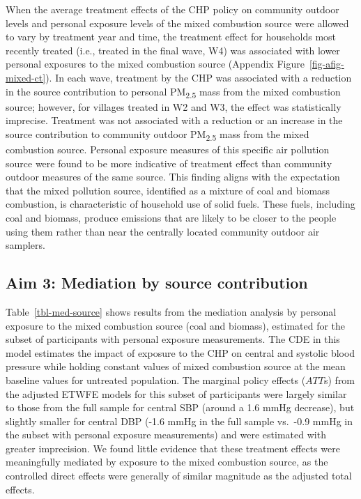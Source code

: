 \documentclass[
  letterpaper,
  DIV=11,
  numbers=noendperiod]{scrartcl}
\begin{document}
When the average treatment effects of the CHP policy on community
outdoor levels and personal exposure levels of the mixed combustion
source were allowed to vary by treatment year and time, the treatment
effect for households most recently treated (i.e., treated in the final
wave, W4) was associated with lower personal exposures to the mixed
combustion source (Appendix Figure~\ref{fig-afig-mixed-ct}). In each
wave, treatment by the CHP was associated with a reduction in the source
contribution to personal PM\textsubscript{2.5} mass from the mixed
combustion source; however, for villages treated in W2 and W3, the
effect was statistically imprecise. Treatment was not associated with a
reduction or an increase in the source contribution to community outdoor
PM\textsubscript{2.5} mass from the mixed combustion source. Personal
exposure measures of this specific air pollution source were found to be
more indicative of treatment effect than community outdoor measures of
the same source. This finding aligns with the expectation that the mixed
pollution source, identified as a mixture of coal and biomass
combustion, is characteristic of household use of solid fuels. These
fuels, including coal and biomass, produce emissions that are likely to
be closer to the people using them rather than near the centrally
located community outdoor air samplers.

\subsection{Aim 3: Mediation by source
contribution}\label{aim-3-mediation-by-source-contribution}

Table~\ref{tbl-med-source} shows results from the mediation analysis by
personal exposure to the mixed combustion source (coal and biomass),
estimated for the subset of participants with personal exposure
measurements. The CDE in this model estimates the impact of exposure to
the CHP on central and systolic blood pressure while holding constant
values of mixed combustion source at the mean baseline values for
untreated population. The marginal policy effects (\(ATT\)s) from the
adjusted ETWFE models for this subset of participants were largely
similar to those from the full sample for central SBP (around a 1.6 mmHg
decrease), but slightly smaller for central DBP (-1.6 mmHg in the full
sample vs.~-0.9 mmHg in the subset with personal exposure measurements)
and were estimated with greater imprecision. We found little evidence
that these treatment effects were meaningfully mediated by exposure to
the mixed combustion source, as the controlled direct effects were
generally of similar magnitude as the adjusted total effects.
\end{document}
